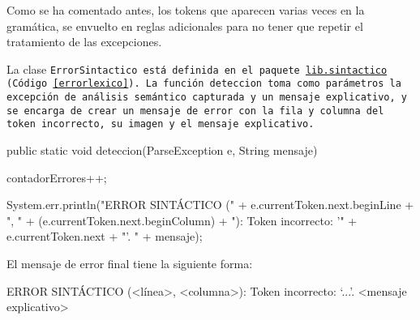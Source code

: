 Como se ha comentado antes, los tokens que aparecen varias veces en la gramática, se envuelto en reglas adicionales para no tener que repetir el tratamiento de las excepciones.

La clase \tt{ErrorSintactico} está definida en el paquete \url{lib.sintactico} (Código~\ref{errorlexico}). La función \tt{deteccion} toma como parámetros la excepción de análisis semántico capturada y un mensaje explicativo, y se encarga de crear un mensaje de error con la fila y columna del token incorrecto, su imagen y el mensaje explicativo.

\begin{codigo}[style=java]
public static void deteccion(ParseException e, String mensaje) {
    contadorErrores++;

    System.err.println("ERROR SINTÁCTICO (" + e.currentToken.next.beginLine +
            ", " + (e.currentToken.next.beginColumn) + "): Token incorrecto: '" +
            e.currentToken.next + "'. " + mensaje);
}
\end{codigo}

El mensaje de error final tiene la siguiente forma:

\begin{codigo}
ERROR SINTÁCTICO (<línea>, <columna>): Token incorrecto: `...'. <mensaje explicativo>
\end{codigo}
